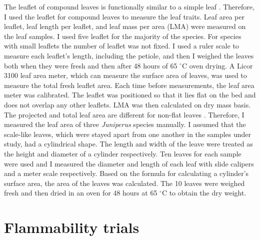 \documentclass{ttuthes2007}
\begin{document}
The leaflet of compound leaves is functionally similar to a simple leaf \citep{perez2016corrigendum}. Therefore, I used the leaflet for compound leaves to measure the leaf traits. Leaf area per leaflet, leaf length per leaflet, and leaf mass per area (LMA) were measured on the leaf samples. I used five leaflet for the majority of the species. For species with small leaflets the number of leaflet was not fixed.
I used a ruler scale to measure each leaflet's length, including the petiole, and then I weighed the leaves both when they were fresh and then after 48 hours of 65 $^{\circ}$C oven drying. A Licor 3100 leaf area meter, which can measure the surface area of leaves, was used to measure the total fresh leaflet area. Each time before measurements, the leaf area meter was calibrated. The leaflet was positioned so that it lies flat on the bed and does not overlap any other leaflets.   %
LMA was then calculated on  dry mass basis. The projected and total leaf area are different for non-flat leaves \citep{perez2016corrigendum, cornelissen2003handbook}. Therefore, I measured the leaf area of three \emph{Juniperus} species manually. I assumed that the scale-like leaves, which were stayed apart from one another in the samples under study, had a cylindrical shape. The length and width of the leave were treated as the height and diameter of a cylinder respectively. Ten leaves for each sample were used and I measured the diameter and length of each leaf with slide calipers and a meter scale respectively. Based on the formula for calculating a cylinder's surface area, the area of the leaves was calculated. The 10 leaves were weighed fresh and then dried in an oven for 48 hours at 65 $^{\circ}$C to obtain the dry weight.


\section{Flammability trials}
\end{document}
